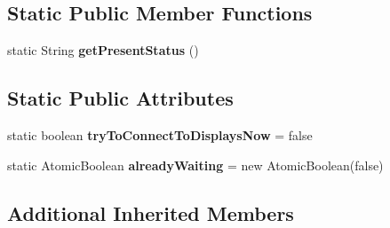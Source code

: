 \subsection*{Static Public Member Functions}
\begin{DoxyCompactItemize}
\item 
\hypertarget{classgov_1_1fnal_1_1ppd_1_1dd_1_1display_1_1DisplayFacade_a78b803ae9cb502e09f8bbd65d7fa741e}{static String {\bfseries get\-Present\-Status} ()}\label{classgov_1_1fnal_1_1ppd_1_1dd_1_1display_1_1DisplayFacade_a78b803ae9cb502e09f8bbd65d7fa741e}

\end{DoxyCompactItemize}
\subsection*{Static Public Attributes}
\begin{DoxyCompactItemize}
\item 
\hypertarget{classgov_1_1fnal_1_1ppd_1_1dd_1_1display_1_1DisplayFacade_a0e46150fb1f40a87bac5060ea85c6dcc}{static boolean {\bfseries try\-To\-Connect\-To\-Displays\-Now} = false}\label{classgov_1_1fnal_1_1ppd_1_1dd_1_1display_1_1DisplayFacade_a0e46150fb1f40a87bac5060ea85c6dcc}

\item 
\hypertarget{classgov_1_1fnal_1_1ppd_1_1dd_1_1display_1_1DisplayFacade_a385e34731c409e71b2cea39b88b7e918}{static Atomic\-Boolean {\bfseries already\-Waiting} = new Atomic\-Boolean(false)}\label{classgov_1_1fnal_1_1ppd_1_1dd_1_1display_1_1DisplayFacade_a385e34731c409e71b2cea39b88b7e918}

\end{DoxyCompactItemize}
\subsection*{Additional Inherited Members}


